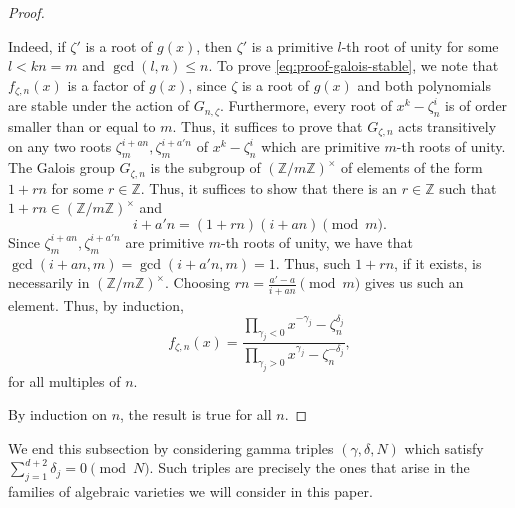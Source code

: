 \documentclass[11pt, reqno]{amsart}
\theoremstyle{plain}
\theoremstyle{definition}
\newcommand{\Z}{\mathbb{Z}}
\newcommand{\ga}{\gamma}
\begin{document}
\begin{proof}
\begin{enumerate}
    Indeed, if $\zeta'$ is a root of $g(x)$, then $\zeta'$ is a primitive $l$-th root of unity for some $l< kn=m$ and $ \gcd(l,n) \le n$. 
    To prove \eqref{eq:proof-galois-stable}, we note that $f_{\zeta,n}(x)$ is a factor of $g(x)$, since $\zeta$ is a root of $g(x)$ and both polynomials are stable under the action of $G_{n,\zeta}$. 
    Furthermore, every root of $x^{k} - \zeta_n^i$ is of order smaller than or equal to $m$.  Thus, it suffices to prove that $G_{\zeta,n}$ acts transitively on
    any two roots $\zeta_m^{i+an}, \zeta_m^{i+a'n}$ of $x^{k} - \zeta_n^i $ which are primitive $m$-th roots of unity. 
    The Galois group $G_{\zeta,n}$ is the subgroup of $(\Z/m\Z)^{\times}$ of elements of the form $1+rn$ for some $r \in \Z$. Thus, it suffices to show that there is an $r \in \Z$ such that $1+rn \in \left(\Z/m\Z\right)^\times$ and
     \[
      i+a'n = (1+rn)(i+an) \pmod{m}.
     \]
    Since  $\zeta_m^{i+an}, \zeta_m^{i+a'n}$ are primitive $m$-th roots of unity, we have that $\gcd(i+an,m)= \gcd(i+a'n,m)=1$. Thus, such $1+rn$, if it exists, is necessarily in $(\Z/m\Z)^\times$. Choosing $rn= \frac{a'-a}{i+an} \pmod{m}$ gives us such an element. Thus, by induction,
    \[
     f_{\zeta,n}(x) = \frac{\prod_{\ga_j<0} x^{-\ga_j}-\zeta_n^{\delta_j}}   {\prod_{\ga_j>0} x^{\ga_j}-\zeta_n^{-\delta_j}},
    \]
    for all multiples of $n$.
\end{enumerate}
By induction on $n$, the result is true for all $n$.
\end{proof}

We end this subsection by considering gamma triples $(\gamma, \delta, N)$ which satisfy $\sum_{j=1}^{d+2} \delta_j = 0 \pmod{N}$. Such triples are precisely the ones that arise in the families of algebraic varieties we will consider in this paper.
\end{document}

